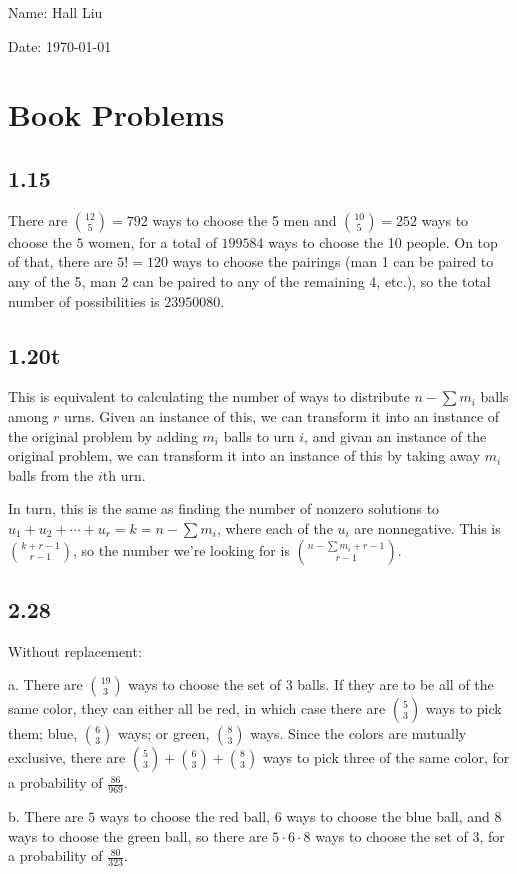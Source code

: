 \documentclass{article}
\begin{document}
Name: Hall Liu

Date: \today 
\vspace{1.5cm}
\section*{Book Problems}
\subsection*{1.15}
There are $\binom{12}{5}=792$ ways to choose the 5 men and $\binom{10}{5}=252$ ways to choose the $5$ women, for a total of $199584$ ways to choose the 10 people. On top of that, there are $5!=120$ ways to choose the pairings (man 1 can be paired to any of the 5, man 2 can be paired to any of the remaining 4, etc.), so the total number of possibilities is $23950080$.
\subsection*{1.20t}
This is equivalent to calculating the number of ways to distribute $n-\sum m_i$ balls among $r$ urns. Given an instance of this, we can transform it into an instance of the original problem by adding $m_i$ balls to urn $i$, and givan an instance of the original problem, we can transform it into an instance of this by taking away $m_i$ balls from the $i$th urn. 

In turn, this is the same as finding the number of nonzero solutions to $u_1+u_2+\cdots+u_r=k=n-\sum m_i$, where each of the $u_i$ are nonnegative. This is $\binom{k+r-1}{r-1}$, so the number we're looking for is $\binom{n-\sum m_i+r-1}{r-1}$.
\subsection*{2.28}
Without replacement: 

a. There are $\binom{19}{3}$ ways to choose the set of $3$ balls. If they are to be all of the same color, they can either all be red, in which case there are $\binom{5}{3}$ ways to pick them; blue, $\binom{6}{3}$ ways; or green, $\binom{8}{3}$ ways. Since the colors are mutually exclusive, there are $\binom{5}{3}+\binom{6}{3}+\binom{8}{3}$ ways to pick three of the same color, for a probability of $\frac{86}{969}$.

b. There are $5$ ways to choose the red ball, $6$ ways to choose the blue ball, and $8$ ways to choose the green ball, so there are $5\cdot6\cdot8$ ways to choose the set of $3$, for a probability of $\frac{80}{323}$.
\end{document}
